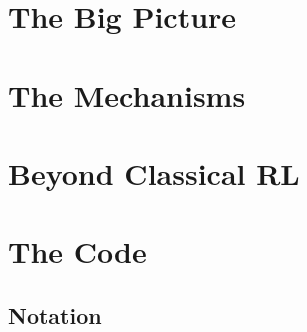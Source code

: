 \documentclass[11pt,a4paper,openany]{book}
\theoremstyle{definition}
\theoremstyle{remark}
\begin{document}
\mainmatter

\part{The Big Picture}



\part{The Mechanisms}







\part{Beyond Classical RL}



\part{The Code}


\backmatter

\chapter*{Notation}
\end{document}
